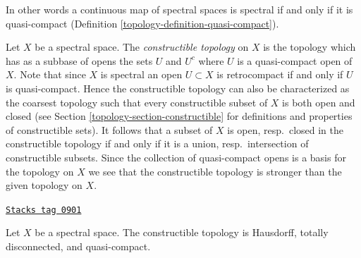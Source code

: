 In other words a continuous map of spectral spaces is spectral if and
only if it is quasi-compact (Definition \ref{topology-definition-quasi-compact}).

\medskip\noindent
Let $X$ be a spectral space. The {\it constructible topology} on $X$
is the topology which has as a subbase of opens the sets $U$ and $U^c$
where $U$ is a quasi-compact open of $X$. Note that since $X$ is spectral
an open $U \subset X$ is retrocompact if and only if $U$ is quasi-compact.
Hence the constructible topology can also be characterized as the coarsest
topology such that every constructible subset of $X$ is both open and closed
(see Section \ref{topology-section-constructible} for definitions and properties of
constructible sets).
It follows that a subset of $X$ is open, resp.\ closed in the constructible
topology if and only if it is a union, resp.\ intersection of constructible
subsets. Since the collection of quasi-compact opens is a basis for the topology
on $X$ we see that the constructible topology is stronger than the
given topology on $X$.

\begin{lemma}
\label{topology-lemma-constructible-hausdorff-quasi-compact}
\href{https://stacks.math.columbia.edu/tag/0901}{\texttt{Stacks tag 0901}}

Let $X$ be a spectral space. The constructible topology is
Hausdorff, totally disconnected, and quasi-compact.
\end{lemma}

